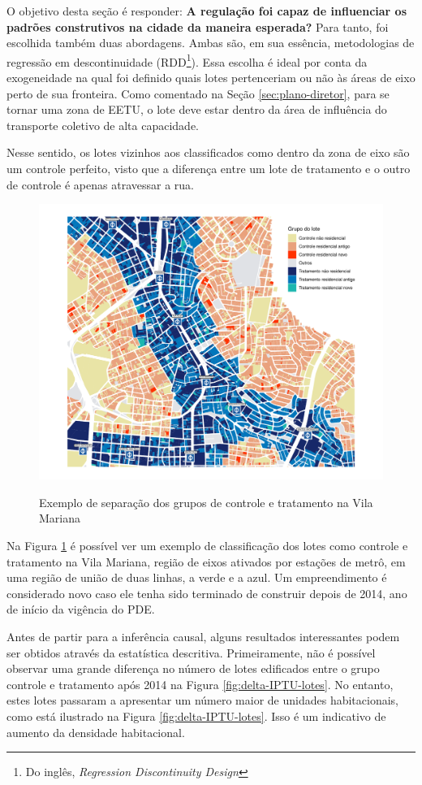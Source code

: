 O objetivo desta seção é responder: \textbf{A regulação foi capaz de influenciar os padrões construtivos na cidade da maneira esperada?} Para tanto, foi escolhida também duas abordagens. Ambas são, em sua essência, metodologias de regressão em descontinuidade (RDD\footnote{Do inglês, \textit{Regression Discontinuity Design}}). Essa escolha é ideal por conta da exogeneidade na qual foi definido quais lotes pertenceriam ou não às áreas de eixo perto de sua fronteira. Como comentado na Seção \ref{sec:plano-diretor}, para se tornar uma zona de EETU, o lote deve estar dentro da área de influência do transporte coletivo de alta capacidade. 

Nesse sentido, os lotes vizinhos aos classificados como dentro da zona de eixo são um controle perfeito, visto que a diferença entre um lote de tratamento e o outro de controle é apenas atravessar a rua.

\begin{figure}[h]
    \centering
    \caption{Exemplo de separação dos grupos de controle e tratamento na Vila Mariana}
    \includegraphics[width = .9\textwidth]{figuras/mapa-lotes-metro.pdf}
    \label{fig:mapaRDD}
\end{figure}

Na Figura \ref{fig:mapaRDD} é possível ver um exemplo de classificação dos lotes como controle e tratamento na Vila Mariana, região de eixos ativados por estações de metrô, em uma região de união de duas linhas, a verde e a azul. Um empreendimento é considerado novo caso ele tenha sido terminado de construir depois de 2014, ano de início da vigência do PDE. 

Antes de partir para a inferência causal, alguns resultados interessantes podem ser obtidos através da estatística descritiva. Primeiramente, não é possível observar uma grande diferença no número de lotes edificados entre o grupo controle e tratamento após 2014 na Figura \ref{fig:delta-IPTU-lotes}. No entanto, estes lotes passaram a apresentar um número maior de unidades habitacionais, como está ilustrado na Figura \ref{fig:delta-IPTU-lotes}. Isso é um indicativo de aumento da densidade habitacional.  

